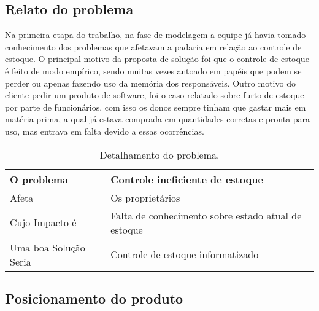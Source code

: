 \begin{appendices}
\subsection{Relato do problema}
	Na primeira etapa do trabalho, na fase de modelagem a equipe já havia tomado conhecimento dos problemas que afetavam a padaria em relação ao controle de estoque.
	O principal motivo da proposta de solução foi que o controle de estoque é feito de modo empírico, sendo muitas vezes antoado em papéis que podem se perder ou apenas fazendo uso da memória dos responsáveis. Outro motivo do cliente pedir um produto de software, foi o caso relatado sobre furto de estoque por parte de funcionários, com isso os donos sempre tinham que gastar mais em matéria-prima, a qual já estava comprada em quantidades corretas e pronta para uso, mas entrava em falta devido a essas ocorrências.

	\begin{table}[htb]
	\centering
    \begin{tabular}{|l|l|}
        \hline
        O problema          & {\parbox{12cm}{Controle ineficiente de estoque}}                                        \\ \hline
        Afeta          & {\parbox{12cm}{Os proprietários}}                                                \\ \hline
        Cujo Impacto é            & {\parbox{12cm}{Falta de conhecimento sobre estado atual de estoque}}                                                                \\ 
        Uma boa Solução Seria             & {\parbox{12cm}{Controle de estoque informatizado}}                         \\ \hline
    \end{tabular}
    \caption{Detalhamento do problema.}
    \end{table}


\subsection{Posicionamento do produto}


\end{appendices}
